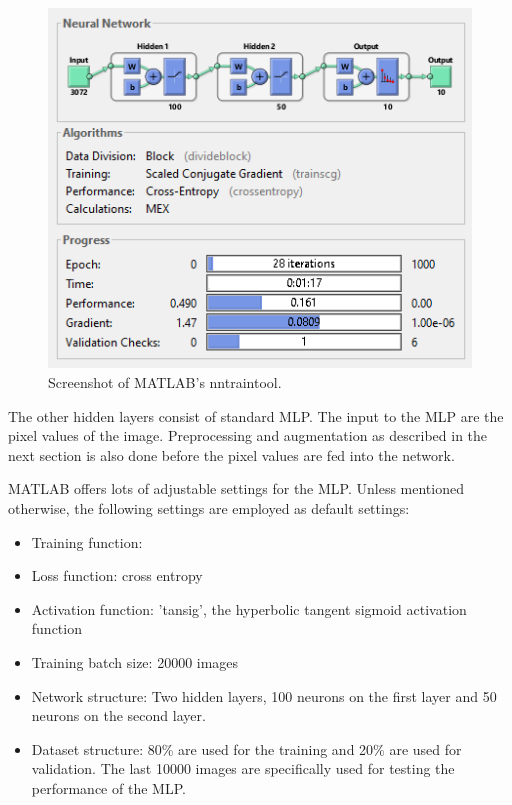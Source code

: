\begin{figure}[h!]
  	\centering
  	\includegraphics{images/NNtool}
  	\caption{Screenshot of MATLAB's nntraintool.}
  	\label{fig:NNtool}
\end{figure}

The other hidden layers consist of standard MLP. The input to the MLP are the pixel values of the image. Preprocessing and augmentation as described in the next section is also done before the pixel values are fed into the network.

MATLAB offers lots of adjustable settings for the MLP. Unless mentioned otherwise, the following settings are employed as default settings:

\begin{itemize}
	\item Training function: 
	
	\item Loss function: cross entropy
	
	\item Activation function: 'tansig', the hyperbolic tangent sigmoid activation function 
	
	\item Training batch size: 20000 images
	
	\item Network structure: Two hidden layers, 100 neurons on the first layer and 50 neurons on the second layer.
	
	\item Dataset structure: 80\% are used for the training and 20\% are used for validation. The last 10000 images are specifically used for testing the performance of the MLP.
\end{itemize}

